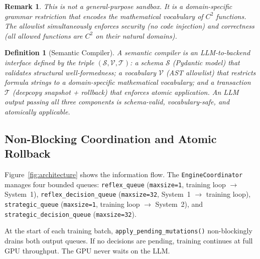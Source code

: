 \documentclass[11pt,a4paper]{article}
\newtheorem{definition}{Definition}
\newtheorem{remark}{Remark}
\begin{document}
\begin{remark}
This is not a general-purpose sandbox. It is a domain-specific grammar restriction
that encodes the mathematical vocabulary of $C^2$ functions. The allowlist
simultaneously enforces security (no code injection) and correctness (all allowed
functions are $C^2$ on their natural domains).
\end{remark}

\begin{definition}[Semantic Compiler]
A \emph{semantic compiler} is an LLM-to-backend interface defined by the triple
$(\mathcal{S}, \mathcal{V}, \mathcal{T})$: a \emph{schema} $\mathcal{S}$ (Pydantic
model) that validates structural well-formedness; a \emph{vocabulary} $\mathcal{V}$
(AST allowlist) that restricts formula strings to a domain-specific mathematical
vocabulary; and a \emph{transaction} $\mathcal{T}$ (deepcopy snapshot + rollback)
that enforces atomic application. An LLM output passing all three components is
\emph{schema-valid}, \emph{vocabulary-safe}, and \emph{atomically applicable}.
\end{definition}

\subsection{Non-Blocking Coordination and Atomic Rollback}
\label{sec:agent:coord}

Figure~\ref{fig:architecture} shows the information flow. The \texttt{EngineCoordinator}
manages four bounded queues: \texttt{reflex\_queue} (\texttt{maxsize=1}, training
loop $\to$ System~1), \texttt{reflex\_decision\_queue} (\texttt{maxsize=32}, System~1
$\to$ training loop), \texttt{strategic\_queue} (\texttt{maxsize=1}, training loop
$\to$ System~2), and \texttt{strategic\_decision\_queue} (\texttt{maxsize=32}).

At the start of each training batch, \texttt{apply\_pending\_mutations()} non-blockingly
drains both output queues. If no decisions are pending, training continues at full GPU
throughput. The GPU never waits on the LLM.
\end{document}
